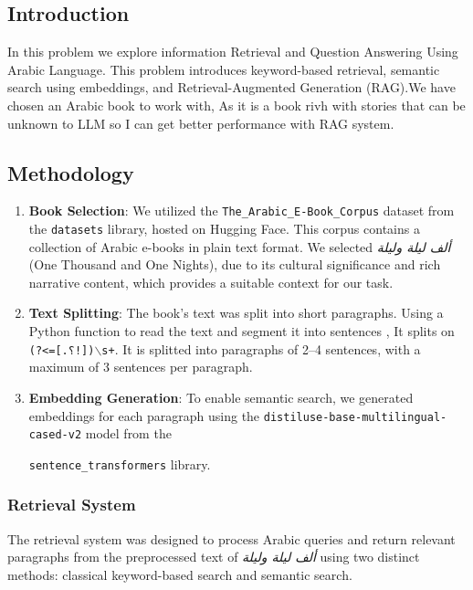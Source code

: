 \documentclass[12pt]{article}
\begin{document}
\subsection{Introduction}
In this problem we explore information Retrieval and Question Answering Using Arabic Language. This problem introduces  keyword-based retrieval, semantic search using embeddings, and Retrieval-Augmented Generation (RAG).We have chosen an Arabic book  \arabicfont {} to work with, As it is a book rivh with stories that can be unknown to LLM so I can get better performance with RAG system.

\subsection{Methodology}



\begin{enumerate}
    \item \textbf{Book Selection}: We utilized the \texttt{The\_Arabic\_E-Book\_Corpus} dataset from the \texttt{datasets} library, hosted on Hugging Face. This corpus contains a collection of Arabic e-books in plain text format. We selected \textit{ألف ليلة وليلة} (One Thousand and One Nights), due to its cultural significance and rich narrative content, which provides a suitable context for our task.
    
    \item \textbf{Text Splitting}: The book’s text was split into short paragraphs. Using a Python function to read the text and segment it into sentences , It splits on \texttt{(?<=[.؟!])$\backslash$s+}. It is splitted into paragraphs of 2–4 sentences, with a maximum of 3 sentences per paragraph.
    
    \item \textbf{Embedding Generation}: To enable semantic search, we generated embeddings for each paragraph using the \texttt{distiluse-base-multilingual-cased-v2} model from 
    the
    
    \texttt{sentence\_transformers} library. 

    \end{enumerate}

\subsubsection{Retrieval System}

The retrieval system was designed to process Arabic queries and return relevant paragraphs from the preprocessed text of \textit{ألف ليلة وليلة} using two distinct methods: classical keyword-based search and semantic search. 
\end{document}
